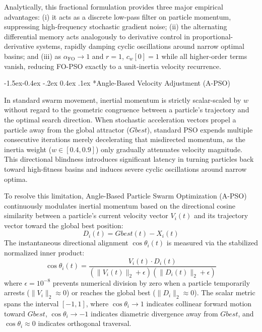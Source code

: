 \documentclass[10pt]{article}
\makeatletter
\renewcommand\subsubsection{\@startsection{subsubsection}{3}{\z@}%
                                     {-1.5ex\@plus -0.4ex \@minus -.2ex}%
                                     {0.4ex \@plus .1ex}%
                                     {\normalfont\itshape\fontsize{7.8pt}{10.0pt}\selectfont}}
\makeatother
\begin{document}
Analytically, this fractional formulation provides three major empirical advantages: (i) it acts as a discrete low-pass filter on particle momentum, suppressing high-frequency stochastic gradient noise; (ii) the alternating differential memory acts analogously to derivative control in proportional-derivative systems, rapidly damping cyclic oscillations around narrow optimal basins; and (iii) as $\alpha_{\mathrm{FO}} \to 1$ and $r=1$, $c_w[0] = 1$ while all higher-order terms vanish, reducing FO-PSO exactly to a unit-inertia velocity recurrence.


\subsubsection*{Angle-Based Velocity Adjustment (A-PSO)}

In standard swarm movement, inertial momentum is strictly scalar-scaled by $w$ without regard to the geometric congruence between a particle's trajectory and the optimal search direction. When stochastic acceleration vectors propel a particle away from the global attractor ($Gbest$), standard PSO expends multiple consecutive iterations merely decelerating that misdirected momentum, as the inertia weight ($w \in [0.4, 0.9]$) only gradually attenuates velocity magnitude. This directional blindness introduces significant latency in turning particles back toward high-fitness basins and induces severe cyclic oscillations around narrow optima.

To resolve this limitation, Angle-Based Particle Swarm Optimization (A-PSO) continuously modulates inertial momentum based on the directional cosine similarity between a particle's current velocity vector $V_i(t)$ and its trajectory vector toward the global best position:
\begin{equation}
D_i(t) = Gbest(t) - X_i(t) \label{eq:direction_to_gbest}
\end{equation}
The instantaneous directional alignment $\cos\theta_i(t)$ is measured via the stabilized normalized inner product:
\begin{equation}
\cos\theta_i(t) = \frac{V_i(t) \cdot D_i(t)}{(\|V_i(t)\|_2 + \epsilon)(\|D_i(t)\|_2 + \epsilon)} \label{eq:apso_cos_theta}
\end{equation}
where $\epsilon = 10^{-8}$ prevents numerical division by zero when a particle temporarily arrests ($\|V_i\|_2 \approx 0$) or reaches the global best ($\|D_i\|_2 \approx 0$). The scalar metric spans the interval $[-1, 1]$, where $\cos\theta_i \to 1$ indicates collinear forward motion toward $Gbest$, $\cos\theta_i \to -1$ indicates diametric divergence away from $Gbest$, and $\cos\theta_i \approx 0$ indicates orthogonal traversal.
\end{document}
